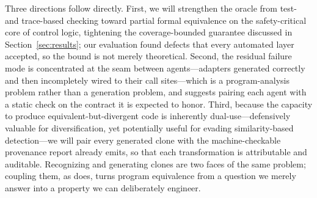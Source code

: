 Three directions follow directly. First, we will strengthen the oracle from test- and trace-based checking toward partial formal equivalence on the safety-critical core of control logic, tightening the coverage-bounded guarantee discussed in Section~\ref{sec:results}; our evaluation found defects that every automated layer accepted, so the bound is not merely theoretical. Second, the residual failure mode is concentrated at the seam between agents---adapters generated correctly and then incompletely wired to their call sites---which is a program-analysis problem rather than a generation problem, and suggests pairing each agent with a static check on the contract it is expected to honor. Third, because the capacity to produce equivalent-but-divergent code is inherently dual-use---defensively valuable for diversification, yet potentially useful for evading similarity-based detection---we will pair every generated clone with the machine-checkable provenance report \sys already emits, so that each transformation is attributable and auditable. Recognizing and generating clones are two faces of the same problem; coupling them, as \sys does, turns program equivalence from a question we merely answer into a property we can deliberately engineer.
